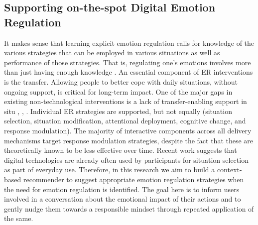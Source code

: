 \subsection{Supporting on-the-spot Digital Emotion Regulation}
It makes sense that learning explicit emotion regulation calls for knowledge of the various strategies that can be employed in various situations as well as performance of those strategies. That is, regulating one's emotions involves more than just having enough knowledge \cite{slovak2022designing}. An essential component of ER interventions is the transfer. Allowing people to better cope with daily situations, without ongoing support, is critical for long-term impact. One of the major gaps in existing non-technological interventions is a lack of transfer-enabling support in situ \cite{slovak2016scaffolding}, \cite{antle2018opening}, \cite{antle2019design}. Individual ER strategies are supported, but not equally (situation selection, situation modification, attentional deployment, cognitive change, and response modulation). The majority of interactive components across all delivery mechanisms target response modulation strategies, despite the fact that these are theoretically known to be less effective over time. Recent work suggests that digital technologies are already often used by participants for situation selection as part of everyday use. Therefore, in this research we aim to build a context-based recommender to suggest appropriate emotion regulation strategies when the need for emotion regulation is identified. The goal here is to inform users involved in a conversation about the emotional impact of their actions and to gently nudge them towards a responsible mindset through repeated application of the same.